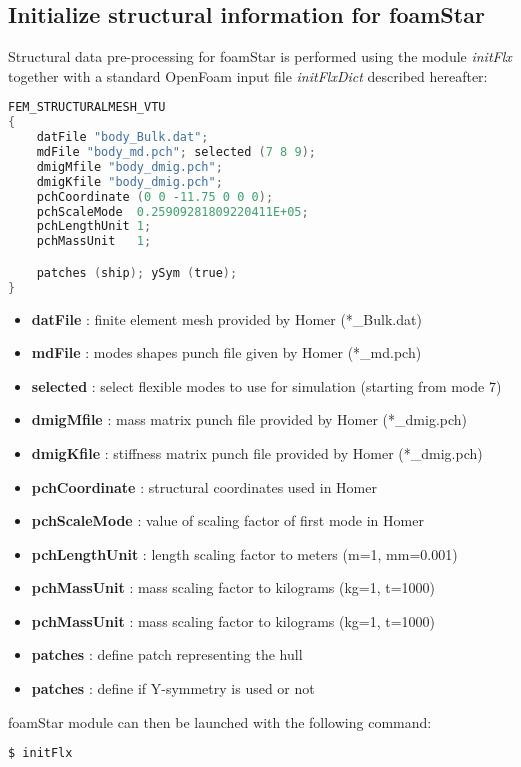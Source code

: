 \subsection{Initialize structural information for foamStar}

Structural data pre-processing for foamStar is performed using the module \emph{initFlx} together with a standard OpenFoam input file \emph{initFlxDict} described hereafter:

\begin{lstlisting}[language=C]
FEM_STRUCTURALMESH_VTU
{
    datFile "body_Bulk.dat";
    mdFile "body_md.pch"; selected (7 8 9);
    dmigMfile "body_dmig.pch";
    dmigKfile "body_dmig.pch";
    pchCoordinate (0 0 -11.75 0 0 0);
    pchScaleMode  0.25909281809220411E+05;
    pchLengthUnit 1;
    pchMassUnit   1;

    patches (ship); ySym (true);
}
\end{lstlisting}

\begin{itemize}
\item \textbf{datFile} : finite element mesh provided by Homer (*\_Bulk.dat)
\item \textbf{mdFile} : modes shapes punch file given by Homer (*\_md.pch)
\item \textbf{selected} : select flexible modes to use for simulation (starting from mode 7)
\item \textbf{dmigMfile} : mass matrix punch file provided by Homer (*\_dmig.pch)
\item \textbf{dmigKfile} : stiffness matrix punch file provided by Homer (*\_dmig.pch)
\item \textbf{pchCoordinate} : structural coordinates used in Homer
\item \textbf{pchScaleMode} : value of scaling factor of first mode in Homer
\item \textbf{pchLengthUnit} : length scaling factor to meters (m=1, mm=0.001)
\item \textbf{pchMassUnit} : mass scaling factor to kilograms (kg=1, t=1000)
\item \textbf{pchMassUnit} : mass scaling factor to kilograms (kg=1, t=1000)
\item \textbf{patches} : define patch representing the hull
\item \textbf{patches} : define if Y-symmetry is used or not
\end{itemize}

foamStar module can then be launched with the following command:
\begin{lstlisting}[language=bash]
$ initFlx
\end{lstlisting}


